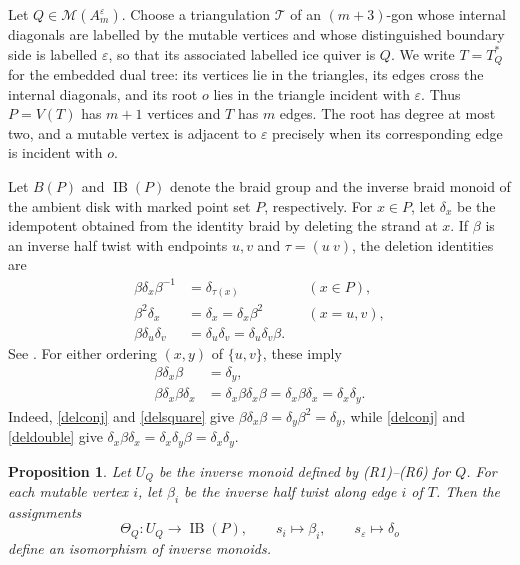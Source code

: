 \documentclass[a4paper, 12pt, reqno]{amsart}
\newtheorem{proposition}[theorem]{Proposition}
\theoremstyle{definition}
\newcommand{\IB}{\operatorname{IB}}
\begin{document}
Let $Q\in\mathcal M(A_m^\varepsilon)$. Choose a triangulation $\mathcal T$ of an $(m+3)$-gon whose internal diagonals are labelled by the mutable
vertices and whose distinguished boundary side is labelled $\varepsilon$, so that its associated labelled ice quiver is $Q$. We write $T=T_Q^*$ for the embedded dual tree: its vertices lie in the triangles, its edges cross the internal diagonals, and its root $o$ lies in the triangle incident with $\varepsilon$. Thus $P=V(T)$ has $m+1$ vertices and $T$ has $m$ edges. The root has degree at most two, and a mutable vertex is adjacent to $\varepsilon$ precisely when its corresponding edge is incident with $o$.

Let $B(P)$ and $\IB(P)$ denote the braid group and the inverse braid monoid of the ambient disk with marked point set $P$, respectively. For $x\in P$, let $\delta_x$ be the idempotent obtained from the identity braid by deleting the strand at $x$. If $\beta$ is an inverse half twist with endpoints $u,v$ and $\tau=(u\ v)$, the deletion identities are
\begin{align}
 \beta\delta_x\beta^{-1}
 &=\delta_{\tau(x)}
 &&(x\in P),\label{delconj}\\
 \beta^2\delta_x
 &=\delta_x=\delta_x\beta^2
 &&(x=u,v),\label{delsquare}\\
 \beta\delta_u\delta_v
 &=\delta_u\delta_v=\delta_u\delta_v\beta.
 &&\label{deldouble}
\end{align}
See \cite[Theorem~2.1]{Vershinin2009}. For either ordering $(x,y)$ of $\{u,v\}$, these imply
\begin{align}
 \beta\delta_x\beta
 &=\delta_y,\label{positiveconj}\\
 \beta\delta_x\beta\delta_x
 &=\delta_x\beta\delta_x\beta
 =\delta_x\beta\delta_x
 =\delta_x\delta_y.\label{mixedlocal}
\end{align}
Indeed, \eqref{delconj} and \eqref{delsquare} give $\beta\delta_x\beta=\delta_y\beta^2=\delta_y$, while \eqref{delconj} and \eqref{deldouble} give $\delta_x\beta\delta_x=\delta_x\delta_y\beta=\delta_x\delta_y$.

\begin{proposition}\label{atype}
Let $U_Q$ be the inverse monoid defined by (R1)--(R6) for $Q$. For each mutable vertex $i$, let $\beta_i$ be the inverse half twist along edge $i$ of $T$. Then the assignments
\[
\Theta_Q:U_Q\longrightarrow\IB(P),\qquad s_i\longmapsto\beta_i,\qquad s_\varepsilon\longmapsto\delta_o
\]
define an isomorphism of inverse monoids.
\end{proposition}
\end{document}

